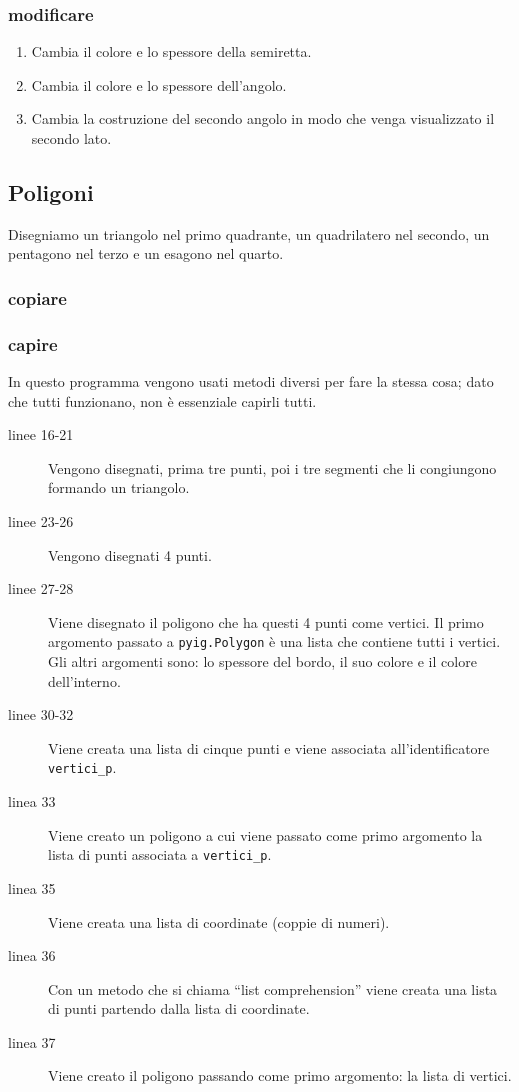 \subsubsection{modificare}

\begin{enumerate} [noitemsep]
 \item Cambia il colore e lo spessore della semiretta.
 \item Cambia il colore e lo spessore dell'angolo.
 \item Cambia la costruzione del secondo angolo in modo che venga 
visualizzato 
il secondo lato.
\end{enumerate}

\subsection{Poligoni}
\label{subsec:geo_int_poligoni}

Disegniamo un triangolo nel primo quadrante, un quadrilatero nel secondo, un 
pentagono nel terzo e un esagono nel quarto.

\subsubsection{copiare}



\subsubsection{capire}

In questo programma vengono usati metodi diversi per fare la stessa cosa; 
dato 
che tutti funzionano, non è essenziale capirli tutti.

\begin{description}
 \item [linee 16-21]
Vengono disegnati, prima tre punti, poi i tre segmenti che li congiungono 
formando un triangolo.
 \item [linee 23-26]
Vengono disegnati 4 punti.
 \item [linee 27-28]
Viene disegnato il poligono che ha questi 4 punti come vertici.
Il primo argomento passato a \lstinline{pyig.Polygon} è una lista che 
contiene 
tutti i vertici.
Gli altri argomenti sono: lo spessore del bordo, il suo colore e il colore 
dell'interno.
 \item [linee 30-32]
Viene creata una lista di cinque punti e viene associata all'identificatore 
\lstinline{vertici_p}.
 \item [linea 33]
Viene creato un poligono a cui viene passato come primo argomento la lista di 
punti associata a \lstinline{vertici_p}.
 \item [linea 35]
Viene creata una lista di coordinate (coppie di numeri).
 \item [linea 36]
Con un metodo che si chiama ``list comprehension'' viene creata una lista di 
punti partendo dalla lista di coordinate.
 \item [linea 37]
Viene creato il poligono passando come primo argomento: la lista di vertici.
\end{description}

